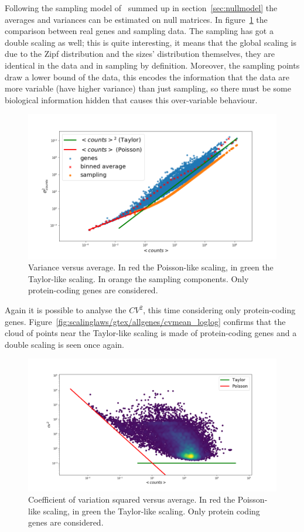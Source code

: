 Following the sampling model of~\cite{Mazzolini2018} summed up in section~\ref{sec:nullmodel} the averages and variances can be estimated on null matrices. In figure~\ref{fig:scalinglaws/gtex/varmean_3sigma} the comparison between real genes and sampling data. The sampling has got a double scaling as well; this is quite interesting, it means that the global scaling is due to the Zipf distribution and the sizes' distribution themselves, they are identical in the data and in sampling by definition.
Moreover, the sampling points draw a lower bound of the data, this encodes the information that the data are more variable (have higher variance) than just sampling, so there must be some biological information hidden that causes this over-variable behaviour.
\begin{figure}[H]
    \centering
    \includegraphics[width=0.8\linewidth]{pictures/scalinglaws/gtex/varmean_3sigma.png}
    \caption{Variance versus average. In \textcolor{pythonred}{red} the Poisson-like scaling, in \textcolor{pythongreen}{green} the Taylor-like scaling. In \textcolor{pythonorange}{orange} the sampling components. Only protein-coding genes are considered.}
    \label{fig:scalinglaws/gtex/varmean_3sigma}
\end{figure}

Again it is possible to analyse the $CV^2$, this time considering only protein-coding genes. Figure~\ref{fig:scalinglaws/gtex/allgenes/cvmean_loglog} confirms that the cloud of points near the Taylor-like scaling is made of protein-coding genes and a double scaling is seen once again.
\begin{figure}[htb!]
    \centering
    \includegraphics[width=0.9\linewidth]{pictures/scalinglaws/gtex/cvmean_loglog_density.png}
    \caption{Coefficient of variation squared versus average. In \textcolor{pythonred}{red} the Poisson-like scaling, in \textcolor{pythongreen}{green} the Taylor-like scaling. Only protein coding genes are considered.}
    \label{fig:scalinglaws/gtex/cvmean_loglog}
\end{figure}

